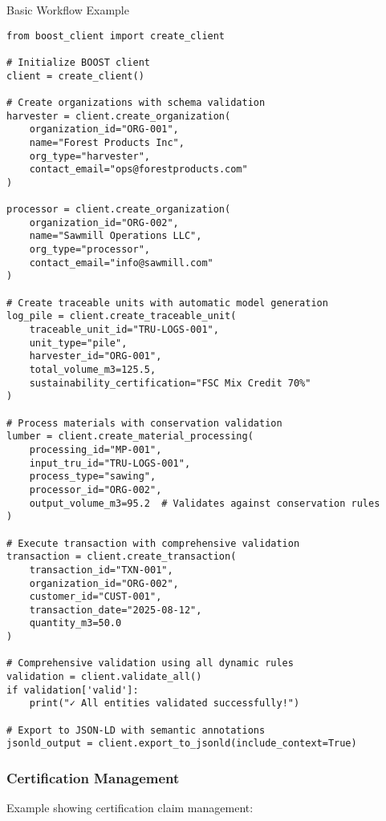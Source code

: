 \begin{pythonexample}{Basic Workflow Example}
\begin{verbatim}
from boost_client import create_client

# Initialize BOOST client
client = create_client()

# Create organizations with schema validation
harvester = client.create_organization(
    organization_id="ORG-001",
    name="Forest Products Inc",
    org_type="harvester",
    contact_email="ops@forestproducts.com"
)

processor = client.create_organization(
    organization_id="ORG-002", 
    name="Sawmill Operations LLC",
    org_type="processor",
    contact_email="info@sawmill.com"
)

# Create traceable units with automatic model generation
log_pile = client.create_traceable_unit(
    traceable_unit_id="TRU-LOGS-001",
    unit_type="pile",
    harvester_id="ORG-001",
    total_volume_m3=125.5,
    sustainability_certification="FSC Mix Credit 70%"
)

# Process materials with conservation validation
lumber = client.create_material_processing(
    processing_id="MP-001",
    input_tru_id="TRU-LOGS-001",
    process_type="sawing",
    processor_id="ORG-002",
    output_volume_m3=95.2  # Validates against conservation rules
)

# Execute transaction with comprehensive validation
transaction = client.create_transaction(
    transaction_id="TXN-001",
    organization_id="ORG-002",
    customer_id="CUST-001",
    transaction_date="2025-08-12",
    quantity_m3=50.0
)

# Comprehensive validation using all dynamic rules
validation = client.validate_all()
if validation['valid']:
    print("✓ All entities validated successfully!")
    
# Export to JSON-LD with semantic annotations
jsonld_output = client.export_to_jsonld(include_context=True)
\end{verbatim}
\end{pythonexample}

\subsubsection{Certification Management}
\label{sec:python-certification}

Example showing certification claim management:

